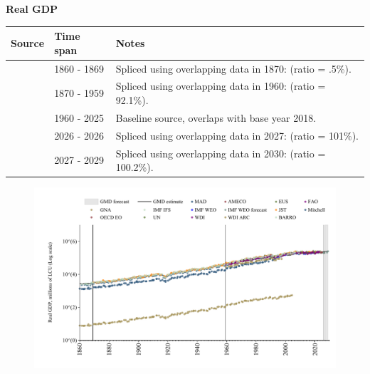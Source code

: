 \documentclass[12pt,a4paper,landscape]{article}
\begin{document}
\begin{adjustbox}{max totalsize={\paperwidth}{\paperheight},center}
\begin{minipage}[t][\textheight][t]{\textwidth}
\vspace*{0.5cm}
{}
\begin{center}
{\Large\bfseries Real GDP}
\end{center}
\vspace{0.5cm}
\begin{table}[H]
\centering
\small
\begin{tabular}{|l|l|l|}
\hline
\textbf{Source} & \textbf{Time span} & \textbf{Notes} \\
\hline
\rowcolor{white}\cite{Mitchell}& 1860 - 1869 &Spliced using overlapping data in 1870: (ratio = .5\%). \\
\rowcolor{lightgray}\cite{JST}& 1870 - 1959 &Spliced using overlapping data in 1960: (ratio = 92.1\%). \\
\rowcolor{white}\cite{OECD_EO}& 1960 - 2025 &Baseline source, overlaps with base year 2018. \\
\rowcolor{lightgray}\cite{AMECO}& 2026 - 2026 &Spliced using overlapping data in 2027: (ratio = 101\%). \\
\rowcolor{white}\cite{IMF_WEO_forecast}& 2027 - 2029 &Spliced using overlapping data in 2030: (ratio = 100.2\%). \\
\hline
\end{tabular}
\end{table}
\begin{figure}[H]
\centering
\includegraphics[width=\textwidth,height=0.6\textheight,keepaspectratio]{graphs/FIN_rGDP.pdf}
\end{figure}
\end{minipage}
\end{adjustbox}
\end{document}
